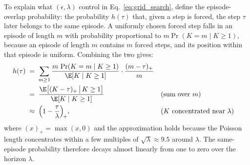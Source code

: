 To explain what $(\epsilon, \lambda)$ control in Eq.~\eqref{eq:grid_search}, define the episode-overlap probability: the probability $h(\tau)$ that, given a step is forced, the
step $\tau$ later belongs to the same episode. A uniformly chosen
forced step falls in an episode of length $m$ with probability
proportional to $m \Pr(K = m \mid K \ge 1)$, because an episode of
length $m$ contains $m$ forced steps, and its position within that
episode is uniform. Combining the two gives:
\begin{align}
  h(\tau)
   &\;=\; \sum_{m \ge 1}
     \frac{m\, \Pr(K = m \mid K \ge 1)}{\E[K \mid K \ge 1]}
     \cdot \frac{(m - \tau)_+}{m}
     \notag \\
   &\;=\; \frac{\E\big[(K - \tau)_+ \,\big|\, K \ge 1\big]}
     {\E[K \mid K \ge 1]}
     && \text{(sum over $m$)} \notag \\
   &\;\approx\; \Big(1 - \frac{\tau}{\lambda}\Big)_{\!+},
     && \text{($K$ concentrated near $\lambda$)}
  \label{eq:supp-h}
\end{align}
where $(x)_+ = \max(x, 0)$ and the approximation holds because the
Poisson length concentrates within a few multiples of
$\sqrt{\lambda} \approx 9.5$ around $\lambda$. The same-episode
probability therefore decays almost linearly from one to zero over
the horizon $\lambda$.

